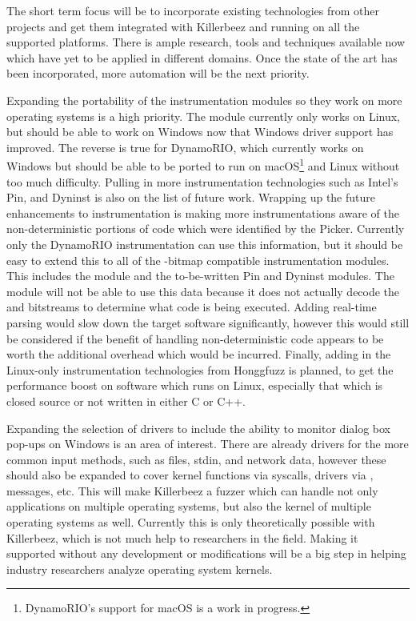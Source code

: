 The short term focus will be to incorporate existing technologies from other
projects and get them integrated with Killerbeez and running on all the
supported platforms.  There is ample research, tools and techniques available
now which have yet to be applied in different domains. Once the state of the
art has been incorporated, more automation will be the next priority.

Expanding the portability of the instrumentation modules so they work on more
operating systems is a high priority. The \IPT{} module currently only works
on Linux, but should be able to work on Windows now that Windows \IPT{} driver support has
improved. The reverse is true for DynamoRIO, which currently works on Windows
but should be able to be ported to run on macOS\footnote{DynamoRIO's
support for macOS is a work in progress.} and Linux without too much difficulty.
Pulling in more instrumentation technologies such as Intel's Pin,
and Dyninst\cite{dyninst} is also on the list of future work. Wrapping up the
future enhancements to instrumentation is making more instrumentations aware of
the non-deterministic portions of code which were identified by the Picker.
Currently only the DynamoRIO instrumentation can use this information, but
it should be easy to extend this to all of the \AFL{}-bitmap compatible
instrumentation modules.  This includes the \AFL{} module and the to-be-written
Pin and Dyninst modules.  The \IPT{} module will not be able to use this data
because it does not actually decode the \TNT{} and \TIP{} bitstreams to determine what
code is being executed. Adding real-time parsing would slow down the target
software significantly, however this would still be considered if the benefit
of handling non-deterministic code appears to be worth the additional overhead
which would be incurred. Finally, adding in the Linux-only instrumentation
technologies from Honggfuzz\cite{honggfuzz} is planned, to get the performance
boost on software which runs on Linux, especially that which is closed source
or not written in either C or C++.

Expanding the selection of drivers to include the ability to monitor dialog
box pop-ups on Windows is an area of interest. There are already drivers for
the more common input methods, such as files, stdin, and network data, however
these should also be expanded to cover kernel functions via syscalls, drivers
via \IOCTLs{}, \IPC{} messages, etc. This will make Killerbeez a fuzzer
which can handle not only applications on multiple operating systems, but also
the kernel of multiple operating systems as well.  Currently this is only
theoretically possible with Killerbeez, which is not much help to researchers
in the field. Making it supported without any development or modifications
will be a big step in helping industry researchers analyze operating system kernels.

